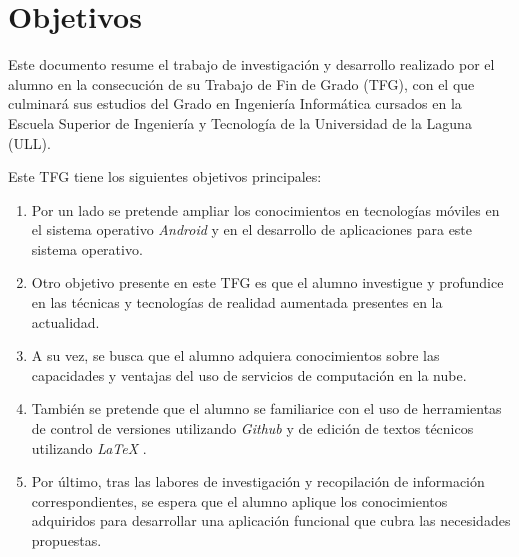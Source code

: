 %
%
%
%
 

\chapter{Objetivos} \label{chap:Objetivos}  

Este documento resume el trabajo de investigación y desarrollo realizado por el alumno en la consecución de su Trabajo de Fin de Grado (TFG), con el que culminará sus estudios del Grado en Ingeniería Informática cursados en la Escuela Superior de Ingeniería y Tecnología de la Universidad de la Laguna (ULL).

Este TFG tiene los siguientes objetivos principales:
	
\begin{enumerate}
\item Por un lado se pretende ampliar los conocimientos en tecnologías móviles en el sistema operativo \textit{Android} \cite{URL::Android} y en el desarrollo de aplicaciones para este sistema operativo.

\item Otro objetivo presente en este TFG es que el alumno investigue y profundice en las técnicas y tecnologías de realidad aumentada presentes en la actualidad.

\item A su vez, se busca que el alumno adquiera conocimientos sobre las capacidades y ventajas del uso de servicios de computación en la nube.

\item También se pretende que el alumno se familiarice con el uso de herramientas de control de versiones utilizando \textit{Github} \cite{URL::Github} y de edición de textos técnicos utilizando \textit{LaTeX}  \cite{URL::LaTeX}.

\item   Por último, tras las labores de investigación y recopilación de información correspondientes, se espera que el alumno aplique los conocimientos adquiridos para desarrollar una aplicación funcional que cubra las necesidades propuestas.
\end{enumerate} 
